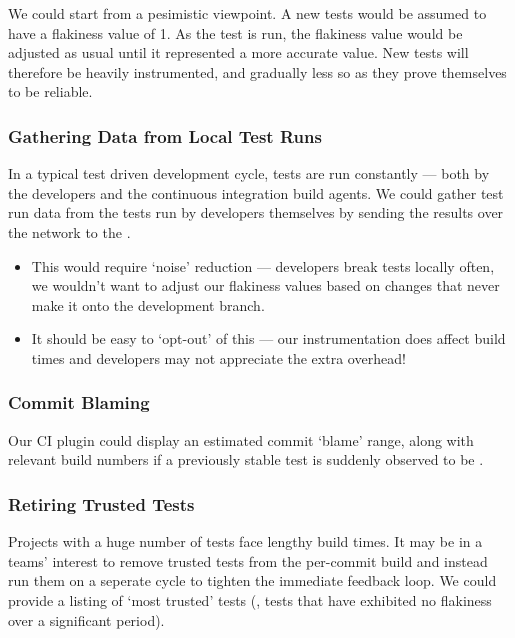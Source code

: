 We could start from a pesimistic viewpoint. A new tests would be assumed to have
a flakiness value of 1. As the test is run, the flakiness value would be
adjusted as usual until it represented a more accurate value. New tests will
therefore be heavily instrumented, and gradually less so as they prove
themselves to be reliable.

\subsubsection{Gathering Data from Local Test Runs}

In a typical test driven development cycle, tests are run constantly --- both by
the developers and the continuous integration build agents. We could gather test
run data from the tests run by developers themselves by sending the results over
the network to the \jenkinsPlugin.

\begin{itemize}
	\item This would require {\lq}noise{\rq} reduction --- developers break tests
	locally often, we wouldn't want to adjust our flakiness values based on
	changes that never make it onto the development branch.
	\item It should be easy to {\lq}opt-out{\rq} of this --- our instrumentation
	does affect build times and developers may not appreciate the extra overhead!
\end{itemize}

\subsubsection{Commit Blaming}

Our CI plugin could display an estimated commit {\lq}blame{\rq} range, along
with relevant build numbers if a previously stable test is suddenly observed to
be \flaky.

\subsubsection{Retiring Trusted Tests}

Projects with a huge number of tests face lengthy build times. It may be in a
teams' interest to remove trusted tests from the per-commit build and instead
run them on a seperate cycle to tighten the immediate feedback loop. We could
provide a listing of {\lq}most trusted{\rq} tests (\ie, tests that have
exhibited no flakiness over a significant period).

